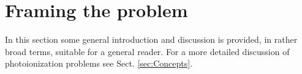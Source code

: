 \documentclass[10pt]{article}
\begin{document}



\section{Framing the problem\label{sec:Framing}}

In this section some general introduction and discussion is provided, in rather broad terms, suitable for a general reader. For a more detailed discussion of photoionization problems see Sect. \ref{sec:Concepts}.
\end{document}

